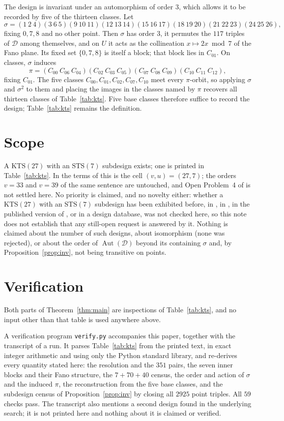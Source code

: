 \documentclass[11pt]{amsart}
\theoremstyle{remark}
\newcommand{\KTS}{\mathrm{KTS}}
\newcommand{\STS}{\mathrm{STS}}
\begin{document}
The design is invariant under an automorphism of order $3$, which allows it to be
recorded by five of the thirteen classes. Let
\[
 \sigma=(1\ 2\ 4)(3\ 6\ 5)(9\ 10\ 11)(12\ 13\ 14)(15\ 16\ 17)
        (18\ 19\ 20)(21\ 22\ 23)(24\ 25\ 26),
\]
fixing $0,7,8$ and no other point. Then $\sigma$ has order $3$, it permutes the
$117$ triples of $\mathcal D$ among themselves, and on $U$ it acts as the
collineation $x\mapsto 2x \bmod 7$ of the Fano plane. Its fixed set
$\{0,7,8\}$ is itself a block; that block lies in $C_{01}$. On classes,
$\sigma$ induces
\[
 \pi=(C_{00}\ C_{06}\ C_{04})(C_{02}\ C_{03}\ C_{05})
     (C_{07}\ C_{08}\ C_{09})(C_{10}\ C_{11}\ C_{12}),
\]
fixing $C_{01}$. The five classes $C_{00},C_{01},C_{02},C_{07},C_{10}$ meet
every $\pi$-orbit, so applying $\sigma$ and $\sigma^2$ to them and placing the
images in the classes named by $\pi$ recovers all thirteen classes of
Table~\ref{tab:kts}. Five base classes therefore suffice to record the design;
Table~\ref{tab:kts} remains the definition.

\section{Scope}

A $\KTS(27)$ with an $\STS(7)$ subdesign exists; one is printed in
Table~\ref{tab:kts}. In the terms of \cite{DL} this is the cell $(v,u)=(27,7)$;
the orders $v=33$ and $v=39$ of the same sentence are untouched, and Open
Problem~4 of \cite{Stinson} is not settled here. No priority is claimed, and no
novelty either: whether a $\KTS(27)$ with an $\STS(7)$ subdesign has been
exhibited before, in \cite{KO}, in \cite[\S19.7]{ColbournRosa}, in the published
version of \cite{DL}, or in a design database, was not checked here, so this
note does not establish that any still-open request is answered by it. Nothing
is claimed about the number of such designs, about isomorphism (none was
rejected), or about the order of $\operatorname{Aut}(\mathcal D)$ beyond its
containing $\sigma$ and, by Proposition~\ref{prop:inv}, not being transitive on
points.

\section{Verification}

Both parts of Theorem~\ref{thm:main} are inspections of Table~\ref{tab:kts}, and
no input other than that table is used anywhere above.

A verification program \texttt{verify.py} accompanies this paper, together with
the transcript of a run. It parses Table~\ref{tab:kts} from the printed text,
in exact integer arithmetic and using only the Python standard library, and
re-derives every quantity stated here: the resolution and the $351$ pairs, the
seven inner blocks and their Fano structure, the $7+70+40$ census, the order and
action of $\sigma$ and the induced $\pi$, the reconstruction from the five base
classes, and the subdesign census of Proposition~\ref{prop:inv} by closing all
$2925$ point triples. All $59$ checks pass. The transcript also mentions a
second design found in the underlying search; it is not printed here and nothing
about it is claimed or verified.
\end{document}
